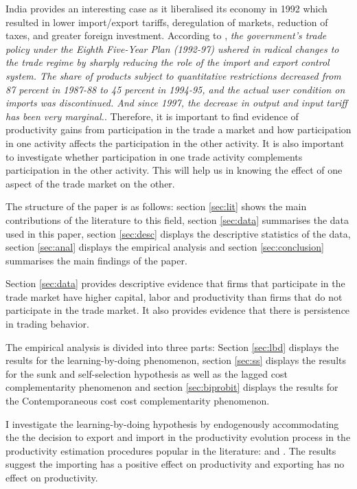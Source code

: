 \documentclass[12pt]{article}
\begin{document}
India provides an interesting case as it liberalised its economy in
1992 which resulted in lower import/export
tariffs, deregulation of markets, reduction of taxes, and greater 
foreign investment. According to \textcite{topalova2011trade}, \textit{the government's trade policy under the Eighth Five-Year Plan (1992-97) ushered
in radical changes to the trade regime by sharply reducing the role of
the import and export control system. The share of products subject to quantitative restrictions
decreased from 87 percent in 1987-88 to 45 percent in 1994-95, and the actual user
condition on imports was discontinued. And since 1997, the decrease in
output and input tariff has been very marginal.}. Therefore, it is
important to find evidence of productivity gains from participation in
the trade a market and how participation in one activity affects the
participation in the other activity. It is also important to investigate
whether participation in one trade activity complements participation
in the other activity. This will help us in knowing the effect of one
aspect of the trade market on the other. 

The structure of the paper is as follows: section \ref{sec:lit} shows
the main contributions of the literature to this field, section
\ref{sec:data} summarises the data used in this paper, section
\ref{sec:desc} displays the descriptive statistics of the data,
section \ref{sec:anal} displays the empirical analysis and section 
\ref{sec:conclusion} summarises the main findings of the paper. 

Section \ref{sec:data} provides descriptive evidence that firms that
participate in the trade market have higher capital, labor and
productivity than firms that do not participate in the trade
market. It also provides evidence that there is persistence in trading
behavior.  

The empirical analysis is divided into three parts: Section
\ref{sec:lbd} displays the results for the learning-by-doing
phenomenon, section \ref{sec:ss} displays the results for the sunk and
self-selection hypothesis as well as the lagged cost complementarity
phenomenon and section \ref{sec:biprobit} displays the results for the
Contemporaneous cost cost complementarity phenomenon.

  I investigate the learning-by-doing hypothesis by endogenously
accommodating the the decision to export and import in the
productivity evolution process in the productivity estimation
procedures popular in the literature:
\textcite{levinsohn2003estimating} and
\textcite{ackerberg2006structural}. The results suggest the importing
has a positive effect on productivity and exporting has no effect on
productivity. 
\end{document}
